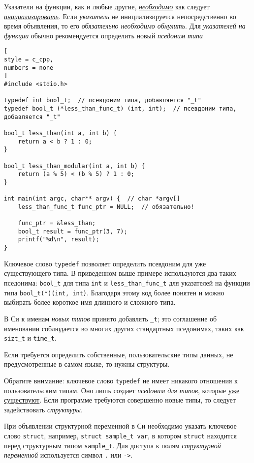 \documentclass[%
	11pt,
	a4paper,
	utf8,
		]{article}
\begin{document}
{\color{blue}Указатели на функции, как и любые другие, \underline{\itshape необходимо} как следует \underline{\itshape инициализировать}. Если \emph{указатель} не инициализируется непосредственно во время объявления, то его \emph{обязательно необходимо обнулить}}. Для \emph{указателей на функции} обычно рекомендуется определить новый \emph{пседоним типа}
\begin{lstlisting}[
style = c_cpp,
numbers = none
]
#include <stdio.h>

typedef int bool_t;  // псевдоним типа, добавляется "_t"
typedef bool_t (*less_than_func_t) (int, int);  // псевдоним типа, добавляется "_t"

bool_t less_than(int a, int b) {
    return a < b ? 1 : 0;
}

bool_t less_than_modular(int a, int b) {
    return (a % 5) < (b % 5) ? 1 : 0;
}

int main(int argc, char** argv) {  // char *argv[]
    less_than_func_t func_ptr = NULL;  // обязательно!
    
    func_ptr = &less_than;
    bool_t result = func_ptr(3, 7);
    printf("%d\n", result);
}
\end{lstlisting}

Ключевое слово \verb|typedef| позволяет определить псевдоним для уже существующего типа. В приведенном выше примере используются два таких пседонима: \verb|bool_t| для типа \verb|int| и \verb|less_than_func_t| для указателей на функции типа \verb|bool_t(*)(int, int)|. Благодаря этому код более понятен и можно выбирать более короткое имя длинного и сложного типа.

В Си к именам \emph{новых типов} принято добавлять \verb|_t|; это соглашение об именовании соблюдается во многих других стандартных пседонимах, таких как \verb|sizt_t| и \verb|time_t|.

Если требуется определить собственные, пользовательские типы данных, не предусмотренные в самом языке, то нужны структуры. 

Обратите внимание: ключевое слово \verb|typedef| не имеет никакого отношения к пользовательским типам. Оно лишь создает \emph{пседоним для типов}, которые \underline{уже существуют}. Если программе требуются совершенно новые типы, то следует задействовать \emph{структуры}.

При объявлении структурной переменной в Си необходимо указать ключевое слово \verb|struct|, например, \verb|struct sample_t var|, в котором \verb|struct| находится перед структурным типом \verb*|sample_t|. Для доступа к полям \emph{структурной переменной} используется символ \verb|.| или \verb*|->|.
\end{document}
